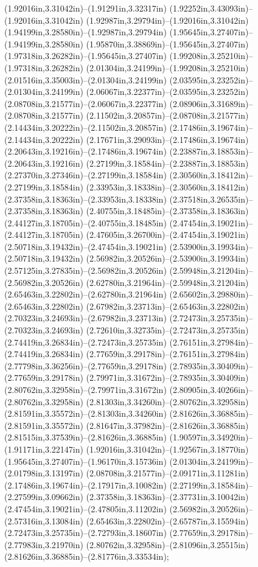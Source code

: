 (1.92016in,3.31042in)--(1.91291in,3.32317in) (1.92252in,3.43093in)--(1.92016in,3.31042in) (1.92987in,3.29794in)--(1.92016in,3.31042in) (1.94199in,3.28580in)--(1.92987in,3.29794in) (1.95645in,3.27407in)--(1.94199in,3.28580in) (1.95870in,3.38869in)--(1.95645in,3.27407in) (1.97318in,3.26282in)--(1.95645in,3.27407in) (1.99208in,3.25210in)--(1.97318in,3.26282in) (2.01304in,3.24199in)--(1.99208in,3.25210in) (2.01516in,3.35003in)--(2.01304in,3.24199in) (2.03595in,3.23252in)--(2.01304in,3.24199in) (2.06067in,3.22377in)--(2.03595in,3.23252in) (2.08708in,3.21577in)--(2.06067in,3.22377in) (2.08906in,3.31689in)--(2.08708in,3.21577in) (2.11502in,3.20857in)--(2.08708in,3.21577in) (2.14434in,3.20222in)--(2.11502in,3.20857in) (2.17486in,3.19674in)--(2.14434in,3.20222in) (2.17671in,3.29093in)--(2.17486in,3.19674in) (2.20643in,3.19216in)--(2.17486in,3.19674in) (2.23887in,3.18853in)--(2.20643in,3.19216in) (2.27199in,3.18584in)--(2.23887in,3.18853in) (2.27370in,3.27346in)--(2.27199in,3.18584in) (2.30560in,3.18412in)--(2.27199in,3.18584in) (2.33953in,3.18338in)--(2.30560in,3.18412in) (2.37358in,3.18363in)--(2.33953in,3.18338in) (2.37518in,3.26535in)--(2.37358in,3.18363in) (2.40755in,3.18485in)--(2.37358in,3.18363in) (2.44127in,3.18705in)--(2.40755in,3.18485in) (2.47454in,3.19021in)--(2.44127in,3.18705in) (2.47605in,3.26700in)--(2.47454in,3.19021in) (2.50718in,3.19432in)--(2.47454in,3.19021in) (2.53900in,3.19934in)--(2.50718in,3.19432in) (2.56982in,3.20526in)--(2.53900in,3.19934in) (2.57125in,3.27835in)--(2.56982in,3.20526in) (2.59948in,3.21204in)--(2.56982in,3.20526in) (2.62780in,3.21964in)--(2.59948in,3.21204in) (2.65463in,3.22802in)--(2.62780in,3.21964in) (2.65602in,3.29880in)--(2.65463in,3.22802in) (2.67982in,3.23713in)--(2.65463in,3.22802in) (2.70323in,3.24693in)--(2.67982in,3.23713in) (2.72473in,3.25735in)--(2.70323in,3.24693in) (2.72610in,3.32735in)--(2.72473in,3.25735in) (2.74419in,3.26834in)--(2.72473in,3.25735in) (2.76151in,3.27984in)--(2.74419in,3.26834in) (2.77659in,3.29178in)--(2.76151in,3.27984in) (2.77798in,3.36256in)--(2.77659in,3.29178in) (2.78935in,3.30409in)--(2.77659in,3.29178in) (2.79971in,3.31672in)--(2.78935in,3.30409in) (2.80762in,3.32958in)--(2.79971in,3.31672in) (2.80905in,3.40266in)--(2.80762in,3.32958in) (2.81303in,3.34260in)--(2.80762in,3.32958in) (2.81591in,3.35572in)--(2.81303in,3.34260in) (2.81626in,3.36885in)--(2.81591in,3.35572in) (2.81647in,3.37982in)--(2.81626in,3.36885in) (2.81515in,3.37539in)--(2.81626in,3.36885in) (1.90597in,3.34920in)--(1.91171in,3.22147in) (1.92016in,3.31042in)--(1.92567in,3.18770in) (1.95645in,3.27407in)--(1.96170in,3.15736in) (2.01304in,3.24199in)--(2.01798in,3.13197in) (2.08708in,3.21577in)--(2.09171in,3.11281in) (2.17486in,3.19674in)--(2.17917in,3.10082in) (2.27199in,3.18584in)--(2.27599in,3.09662in) (2.37358in,3.18363in)--(2.37731in,3.10042in) (2.47454in,3.19021in)--(2.47805in,3.11202in) (2.56982in,3.20526in)--(2.57316in,3.13084in) (2.65463in,3.22802in)--(2.65787in,3.15594in) (2.72473in,3.25735in)--(2.72793in,3.18607in) (2.77659in,3.29178in)--(2.77983in,3.21970in) (2.80762in,3.32958in)--(2.81096in,3.25515in) (2.81626in,3.36885in)--(2.81776in,3.33534in);
